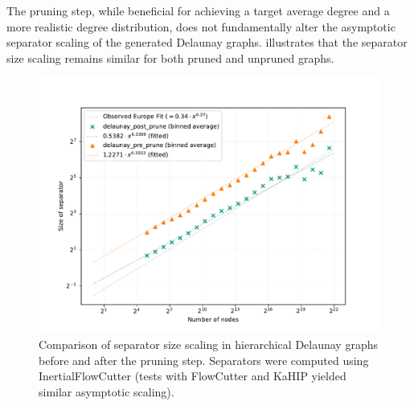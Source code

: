 The pruning step, while beneficial for achieving a target average degree and a more realistic degree distribution, does not fundamentally alter the asymptotic separator scaling of the generated Delaunay graphs.
 illustrates that the separator size scaling remains similar for both pruned and unpruned graphs.

\begin{figure}[tbhp]
	\centering
	\includegraphics[width=0.6\linewidth]{graphics/delaunay_pre_post_pruning_sep_size.pdf}
	\caption{Comparison of separator size scaling in hierarchical Delaunay graphs before and after the pruning step. Separators were computed using InertialFlowCutter (tests with FlowCutter and KaHIP yielded similar asymptotic scaling).}
	\label{fig:delaunay_pruned_vs_pre_pruned_sep}
\end{figure}

